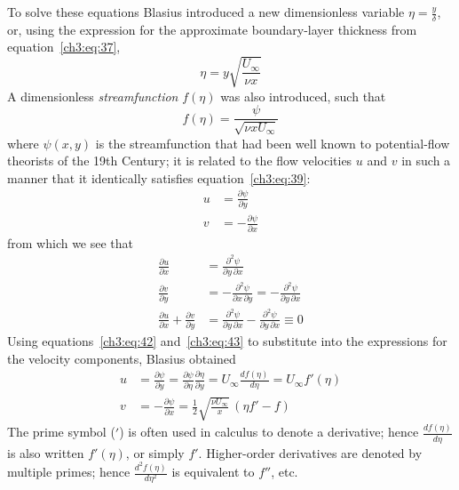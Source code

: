 To solve these equations Blasius introduced a new dimensionless variable
$\eta = \frac{y}{\delta}$, or, using the expression for the approximate
boundary-layer thickness from equation~\eqref{ch3:eq:37},
\begin{equation}\label{ch3:eq:42}
\eta = y\sqrt{\frac{U_\infty}{\nu x}}
\end{equation}
A dimensionless \emph{streamfunction} $f(\eta)$ was also introduced, such that
\begin{equation}\label{ch3:eq:43}
f(\eta) = \frac{\psi}{\sqrt{\nu x U_\infty}}
\end{equation}
where $\psi(x,y)$ is the streamfunction that had been well known to
potential-flow theorists of the 19th Century; it is related to the flow
velocities $u$ and $v$ in such a manner that it identically satisfies
equation~\eqref{ch3:eq:39}:
\begin{subequations}\label{ch3:eq:44}
\begin{align}
u &= \frac{\partial\psi}{\partial y} \label{ch3:eq:44a}\\
v &= -\frac{\partial\psi}{\partial x} \label{ch3:eq:44b}
\end{align}
\end{subequations}
from which we see that
\begin{align*}
\frac{\partial u}{\partial x} &= \frac{\partial^2\psi}{\partial y\,\partial x}\\
\frac{\partial v}{\partial y} &= -\frac{\partial^2\psi}{\partial x\,\partial y}
  = -\frac{\partial^2\psi}{\partial y\,\partial x}\\
\frac{\partial u}{\partial x} + \frac{\partial v}{\partial y}
  &= \frac{\partial^2\psi}{\partial y\,\partial x}
  - \frac{\partial^2\psi}{\partial y\,\partial x} \equiv 0
\end{align*}
Using equations~\eqref{ch3:eq:42} and~\eqref{ch3:eq:43} to substitute into the
expressions for the velocity components, Blasius obtained
\begin{align}
u &= \frac{\partial\psi}{\partial y}
  = \frac{\partial\psi}{\partial\eta}\frac{\partial\eta}{\partial y}
  = U_\infty\frac{df(\eta)}{d\eta} = U_\infty f'(\eta) \label{ch3:eq:45}\\
v &= -\frac{\partial\psi}{\partial x}
  = \tfrac{1}{2}\sqrt{\frac{\nu U_\infty}{x}}\,(\eta f' - f) \label{ch3:eq:46}
\end{align}
The prime symbol (${}'$) is often used in calculus to denote a derivative;
hence $\frac{df(\eta)}{d\eta}$ is also written $f'(\eta)$, or simply $f'$.
Higher-order derivatives are denoted by multiple primes; hence
$\frac{d^2 f(\eta)}{d\eta^2}$ is equivalent to $f''$, etc.

